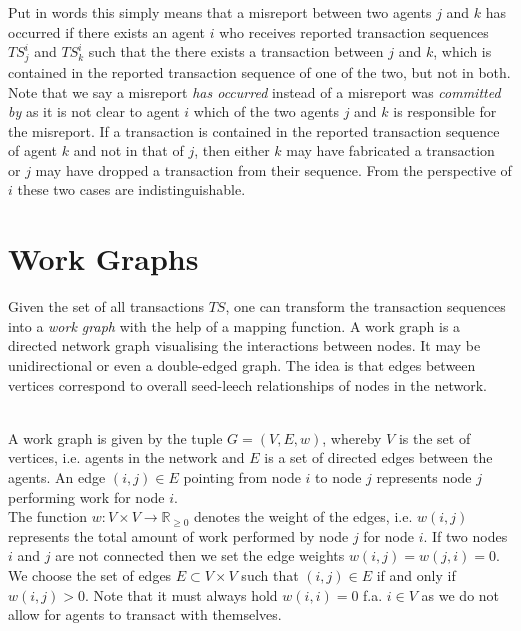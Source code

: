 \noindent{}Put in words this simply means that a misreport between two agents $j$ and $k$ has occurred if there exists an agent $i$ who receives reported transaction sequences $TS_j^i$ and $TS_k^i$ such that the there exists a transaction between $j$ and $k$, which is contained in the reported transaction sequence of one of the two, but not in both. \vspace{1em}\\

\noindent{}Note that we say a misreport {\it has occurred} instead of a misreport was {\it committed by} as it is not clear to agent $i$ which of the two agents $j$ and $k$ is responsible for the misreport. If a transaction is contained in the reported transaction sequence of agent $k$ and not in that of $j$, then either $k$ may have fabricated a transaction or $j$ may have dropped a transaction from their sequence. From the perspective of $i$ these two cases are indistinguishable.\vspace{1em}\\

\section{Work Graphs}
\label{sec:Work Graphs}
\noindent{}Given the set of all transactions $TS$, one can transform the transaction sequences into a {\it work graph} with the help of a mapping function. A work graph is a directed network graph visualising the interactions between nodes. It may be unidirectional or even a double-edged graph. The idea is that edges between vertices correspond to overall seed-leech relationships of nodes in the network. \vspace{1em}\\

\begin{definition}\ \\
\label{def:Work Graph}
\noindent{}A work graph is given by the tuple $G = (V, E, w)$, whereby $V$ is the set of vertices, i.e. agents in the network and $E$ is a set of directed edges between the agents. An edge $(i,j)\in{}E$ pointing from node $i$ to node $j$ represents node $j$ performing work for node $i$. \vspace{1em}\\ The function $w:V\times{}V\rightarrow{}\mathbb{R}_{\geq{}0}$ denotes the weight of the edges, i.e. $w(i,j)$ represents the total amount of work performed by node $j$ for node $i$. If two nodes $i$ and $j$ are not connected then we set the edge weights $w(i,j)=w(j,i)=0$. We choose the set of edges $E\subset{}V\times{}V$ such that $(i,j)\in{}E$ if and only if $w(i,j)>0$. Note that it must always hold $w(i,i)=0$ f.a. $i\in{}V$ as we do not allow for agents to transact with themselves.\vspace{1em}\\ 
\end{definition}

